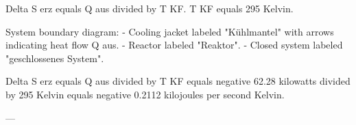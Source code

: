 Delta S erz equals Q aus divided by T KF.  
T KF equals 295 Kelvin.  

System boundary diagram:  
- Cooling jacket labeled "Kühlmantel" with arrows indicating heat flow Q aus.  
- Reactor labeled "Reaktor".  
- Closed system labeled "geschlossenes System".  

Delta S erz equals Q aus divided by T KF equals negative 62.28 kilowatts divided by 295 Kelvin equals negative 0.2112 kilojoules per second Kelvin.  

---